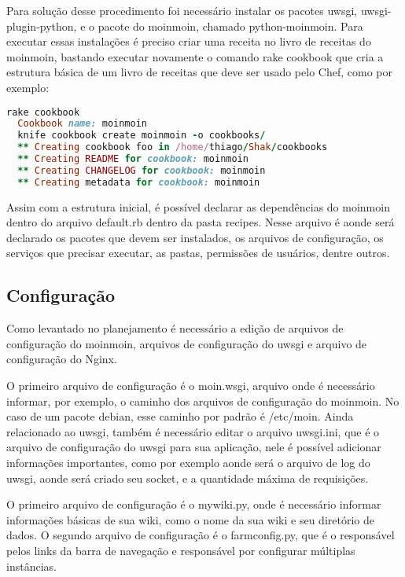 Para solução desse procedimento foi necessário instalar os pacotes uwsgi,
uwsgi-plugin-python, e o pacote do moinmoin, chamado python-moinmoin.
Para executar essas instalações é preciso criar uma receita no livro de receitas
do moinmoin, bastando executar novamente o comando rake cookbook que cria a
estrutura básica de um livro de receitas que deve ser usado pelo Chef, como por exemplo:

\begin{lstlisting}[language=Ruby,label=dice_index,caption={Exemplo de criação de estrutura básica de livro de receitas do moinmoin com shak}]
  rake cookbook
  Cookbook name: moinmoin
  knife cookbook create moinmoin -o cookbooks/
  ** Creating cookbook foo in /home/thiago/Shak/cookbooks
  ** Creating README for cookbook: moinmoin
  ** Creating CHANGELOG for cookbook: moinmoin
  ** Creating metadata for cookbook: moinmoin
\end{lstlisting}

Assim com a estrutura inicial, é possível declarar as dependências do moinmoin
dentro do arquivo default.rb dentro da pasta recipes. Nesse arquivo é aonde
será declarado os pacotes que devem ser instalados, os arquivos de configuração,
os serviços que precisar executar, as pastas, permissões de usuários, dentre outros.

\subsection{Configuração}

Como levantado no planejamento é necessário a edição de arquivos de configuração
do moinmoin, arquivos de configuração do uwsgi e arquivo de configuração
do Nginx.

O primeiro arquivo de configuração é o moin.wsgi, arquivo onde é necessário
informar, por exemplo, o caminho dos arquivos de configuração do moinmoin. No caso
de um pacote debian, esse caminho por padrão é  /etc/moin. Ainda relacionado
ao uwsgi, também é necessário editar o arquivo uwsgi.ini, que é o arquivo de configuração
do uwsgi para sua aplicação, nele é possível adicionar informações importantes, como
por exemplo aonde será o arquivo de log do uwsgi, aonde será criado seu socket,
e a quantidade máxima de requisições.

O primeiro arquivo de configuração é o mywiki.py, onde é necessário
informar informações básicas de sua wiki,  como o nome da sua wiki e seu diretório de dados. 
O segundo arquivo de configuração é o farmconfig.py, que é o responsável pelos 
links da barra de navegação e responsável por configurar múltiplas instâncias.

